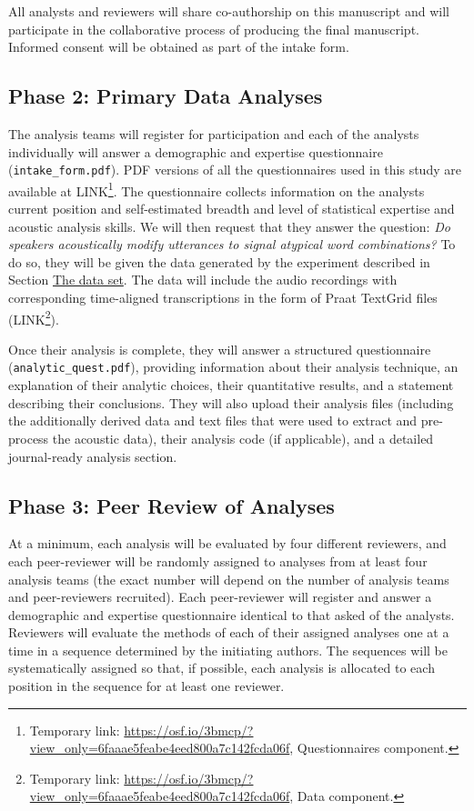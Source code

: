 \documentclass[Review,times,sageh]{sagej}
\begin{document}
All analysts and reviewers will share co-authorship on this manuscript and will participate in the collaborative process of producing the final manuscript.
Informed consent will be obtained as part of the intake form.

\hypertarget{phase-2-primary-data-analyses}{%
\subsection{Phase 2: Primary Data Analyses}\label{phase-2-primary-data-analyses}}

The analysis teams will register for participation and each of the analysts individually will answer a demographic and expertise questionnaire (\texttt{intake\_form.pdf}).
PDF versions of all the questionnaires used in this study are available at LINK\footnote{Temporary link: \url{https://osf.io/3bmcp/?view_only=6faaae5feabe4eed800a7c142fcda06f}, Questionnaires component.}.
The questionnaire collects information on the analysts current position and self-estimated breadth and level of statistical expertise and acoustic analysis skills.
We will then request that they answer the question: \emph{Do speakers acoustically modify utterances to signal atypical word combinations?}
To do so, they will be given the data generated by the experiment described in Section \protect\hyperlink{s:dataset}{The data set}.
The data will include the audio recordings with corresponding time-aligned transcriptions in the form of Praat TextGrid files (LINK\footnote{Temporary link: \url{https://osf.io/3bmcp/?view_only=6faaae5feabe4eed800a7c142fcda06f}, Data component.}).

Once their analysis is complete, they will answer a structured questionnaire (\texttt{analytic\_quest.pdf}), providing information about their analysis technique, an explanation of their analytic choices, their quantitative results, and a statement describing their conclusions.
They will also upload their analysis files (including the additionally derived data and text files that were used to extract and pre-process the acoustic data), their analysis code (if applicable), and a detailed journal-ready analysis section.

\hypertarget{phase-3-peer-review-of-analyses}{%
\subsection{Phase 3: Peer Review of Analyses}\label{phase-3-peer-review-of-analyses}}

At a minimum, each analysis will be evaluated by four different reviewers, and each peer-reviewer will be randomly assigned to analyses from at least four analysis teams (the exact number will depend on the number of analysis teams and peer-reviewers recruited).
Each peer-reviewer will register and answer a demographic and expertise questionnaire identical to that asked of the analysts.
Reviewers will evaluate the methods of each of their assigned analyses one at a time in a sequence determined by the initiating authors.
The sequences will be systematically assigned so that, if possible, each analysis is allocated to each position in the sequence for at least one reviewer.
\end{document}
